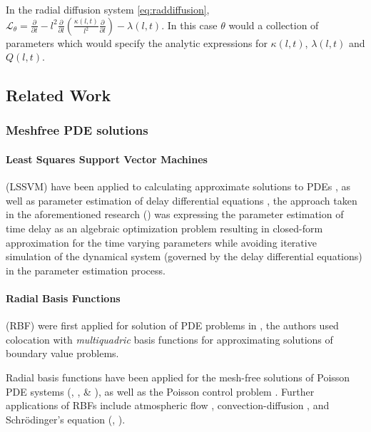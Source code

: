\documentclass{article}
\begin{document}
In the radial diffusion system \ref{eq:raddiffusion}, $\mathcal{L}_{\theta} =
\frac{\partial}{\partial{t}} - l^2 \frac{\partial}{\partial{l}}\left( \frac{\kappa(l,
      t)}{l^{2}} \frac{\partial}{\partial{l}} \right) - \lambda(l,
  t)$. In this case $\theta$ would a collection of parameters which
  would specify the analytic expressions for $\kappa(l,t)$,
  $\lambda(l,t)$ and $Q(l,t)$.


\subsection{Related Work}

\subsubsection*{Meshfree PDE solutions}

\paragraph{Least Squares Support Vector Machines}

(LSSVM) have been applied to calculating approximate solutions to PDEs
\citep{MEHRKANOON2015105}, \citep{MEHRKANOON20122502} as well as
parameter estimation of delay differential equations
\citep{MEHRKANOON2014830}, the approach taken in the aforementioned
research (\citet{MEHRKANOON2014830}) was expressing the parameter
estimation of time delay as an algebraic optimization problem
resulting in closed-form approximation for the time varying parameters
while avoiding iterative simulation of the dynamical system (governed
by the delay differential equations) in the parameter estimation process.

\paragraph{Radial Basis Functions}

(RBF) were first applied for solution of PDE problems in \cite{KANSA1990147}, 
the authors used colocation with \emph{multiquadric} basis functions for approximating solutions
of boundary value problems.

Radial basis functions have been applied for the mesh-free solutions of Poisson PDE systems 
(\citep{AMINATAEI20082887}, \citep{DUAN200866}, \citep{DUAN2006394} \& \citep{CNM:CNM419}),
as well as the Poisson control problem \citet{Pearson2013}. Further applications of RBFs include 
atmospheric flow \citep{Tillenius2015406}, convection-diffusion \citep{Safdari-Vaighani2015}, and 
Schrödinger's equation (\citep{doi:10.1137/120893975}, \citep{doi:10.1063/1.3637863}). 
\end{document}
